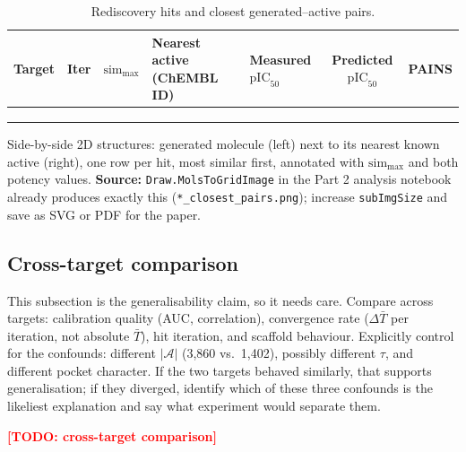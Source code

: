 \documentclass[11pt]{article}
\newcommand{\TODO}[1]{\textcolor{red}{\textbf{[TODO: #1]}}}
\newcommand{\FILL}[1]{\textcolor{blue!65!black}{\underline{\textsf{#1}}}}
\newcommand{\pICfifty}{\mathrm{pIC}_{50}}
\newcommand{\Actives}{\mathcal{A}}              %
\newcommand{\simmax}{\mathrm{sim}_{\max}}
\newcommand{\Tbar}{\bar{T}}
\begin{document}
\begin{table}[h]
\centering
\caption{Rediscovery hits and closest generated--active pairs.}
\label{tab:hits}
\small
\begin{tabular}{llcllcc}
\toprule
Target & Iter & $\simmax$ & Nearest active (ChEMBL ID) & Measured $\pICfifty$ &
Predicted $\pICfifty$ & PAINS \\
\midrule
\FILL{} & \FILL{} & \FILL{} & \FILL{} & \FILL{} & \FILL{} & \FILL{} \\
\FILL{} & \FILL{} & \FILL{} & \FILL{} & \FILL{} & \FILL{} & \FILL{} \\
\FILL{} & \FILL{} & \FILL{} & \FILL{} & \FILL{} & \FILL{} & \FILL{} \\
\bottomrule
\end{tabular}
\end{table}

\begin{figrec}
Side-by-side 2D structures: generated molecule (left) next to its nearest known
active (right), one row per hit, most similar first, annotated with $\simmax$
and both potency values. \textbf{Source:} \texttt{Draw.MolsToGridImage} in the
Part 2 analysis notebook already produces exactly this
(\texttt{*\_closest\_pairs.png}); increase \texttt{subImgSize} and save as SVG
or PDF for the paper.
\end{figrec}

\subsection{Cross-target comparison}
\label{sec:results:cross}

\begin{yourturn}
This subsection is the generalisability claim, so it needs care.
Compare across targets: calibration quality (AUC, correlation), convergence rate
($\Delta \Tbar$ per iteration, not absolute $\Tbar$), hit iteration, and
scaffold behaviour. Explicitly control for the confounds:
different $|\Actives|$ (3{,}860 vs.\ 1{,}402), possibly different $\tau$, and
different pocket character. If the two targets behaved similarly, that supports
generalisation; if they diverged, identify which of these three confounds is the
likeliest explanation and say what experiment would separate them.
\end{yourturn}

\TODO{cross-target comparison}
\end{document}
